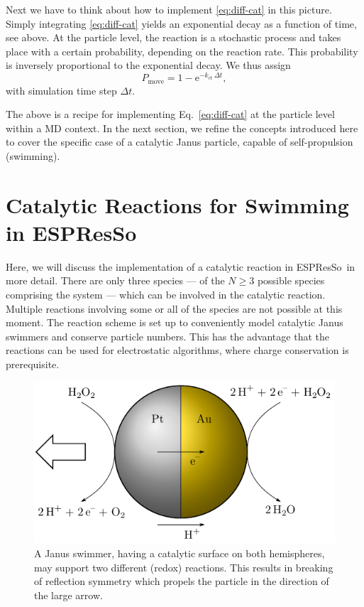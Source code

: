 \documentclass[aip,jcp,reprint,a4paper,onecolumn,nofootinbib,amsmath,amssymb]{revtex4-1}
\newcommand{\es}{\mbox{\textsf{ESPResSo}}\xspace}
\begin{document}
Next we have to think about how to implement \eqref{eq:diff-cat} in this picture. Simply integrating \eqref{eq:diff-cat} yields an exponential decay as a function of time, see above. At the particle level, the reaction is a stochastic process and takes place with a certain probability, depending on the reaction rate. This probability is inversely proportional to the exponential decay. We thus assign
\begin{equation}
  \label{eq:prob}
  P_{\text{move}} = 1 - \mathrm{e}^{-k_{\text{ct}}\,\Delta t} ,
\end{equation}
with simulation time step $\Delta t$.

The above is a recipe for implementing Eq.~\eqref{eq:diff-cat} at the particle level within a MD context. In the next section, we refine the concepts introduced here to cover the specific case of a catalytic Janus particle, capable of self-propulsion (swimming).

\section{Catalytic Reactions for Swimming in \es}

Here, we will discuss the implementation of a catalytic reaction in \es\ in more detail. There are only three species --- of the $N \ge 3$ possible species comprising the system --- which can be involved in the catalytic reaction. Multiple reactions involving some or all of the species are not possible at this moment. The reaction scheme is set up to conveniently model catalytic Janus swimmers and conserve particle numbers. This has the advantage that the reactions can be used for electrostatic algorithms, where charge conservation is prerequisite. 

\begin{figure}
  \centering
  \includegraphics{FIGURES/janus-particle}
  \caption{\label{fig:janus}A Janus swimmer, having a catalytic surface on both hemispheres, may support two different (redox) reactions. This results in breaking of reflection symmetry which propels the particle in the direction of the large arrow.}
\end{figure}
\end{document}
